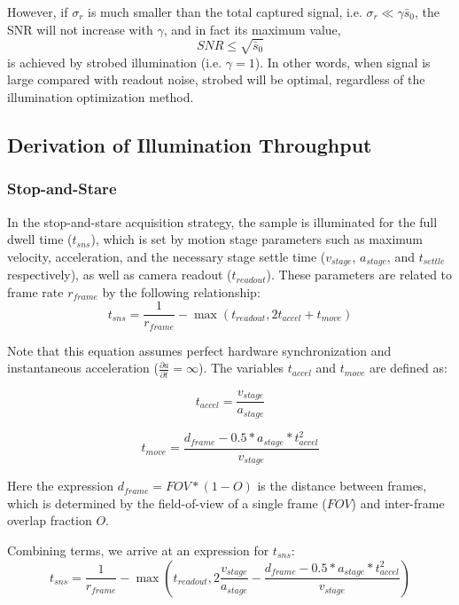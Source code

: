 However, if $\sigma_r$ is much smaller than the total captured signal, i.e. $\sigma_r \ll \gamma \bar{s}_0 $, the SNR will not increase with $\gamma$, and in fact its maximum value,
$$SNR \leq \sqrt{\bar{s}_0}$$
is achieved by strobed illumination (i.e. $\gamma=1$). In other words, when signal is large compared with readout noise, strobed will be optimal, regardless of the illumination optimization method.


\subsection{Derivation of Illumination Throughput}\label{sec:appendix:app_throughput}

\subsubsection{Stop-and-Stare}
In the stop-and-stare acquisition strategy, the sample is illuminated for the full dwell time ($t_{sns}$), which is set by motion stage parameters such as maximum velocity, acceleration, and the necessary stage settle time ($v_{stage}$, $a_{stage}$, and $t_{settle}$ respectively), as well as camera readout ($t_{readout}$). These parameters are related to frame rate $r_{frame}$ by the following relationship:
\begin{equation*}
t_{sns} = \frac{1}{r_{frame}} - \max (t_{readout}, 2t_{accel} + t_{move})
\end{equation*}

Note that this equation assumes perfect hardware synchronization and instantaneous acceleration ($\frac{\partial a}{\partial t} = \infty$). The variables $t_{accel}$ and $t_{move}$ are defined as:

\begin{equation*}
t_{accel} = \frac{v_{stage}}{a_{stage}}
\end{equation*}

\begin{equation*}
t_{move} = \frac{d_{frame} - 0.5 * a_{stage} * t_{accel}^2}{v_{stage}}
\end{equation*}

Here the expression $d_{frame} = FOV * (1-O)$ is the distance between frames, which is determined by the field-of-view of a single frame ($FOV$) and inter-frame overlap fraction $O$.

Combining terms, we arrive at an expression for $t_{sns}$:
\begin{equation*}
t_{sns} = \frac{1}{r_{frame}} - \max (t_{readout}, 2\frac{v_{stage}}{a_{stage}} - \frac{d_{frame} - 0.5 * a_{stage} * t_{accel}^2}{v_{stage}})
\end{equation*}

